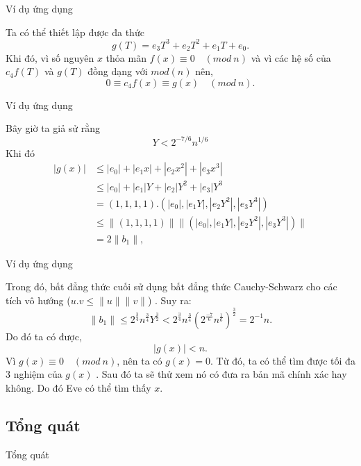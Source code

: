 \documentclass{beamer}
\begin{document}
\begin{frame}{Ví dụ ứng dụng}

Ta có thể thiết lập được đa thức $$g(T) = e_3T^3 + e_2T^2 + e_1T + e_0\text{.}$$
Khi đó, vì số nguyên $x$ thỏa mãn $f(x) \equiv 0 \quad (mod \ n) $ và vì các hệ số của $c_4f(T)$ và $g(T)$ đồng dạng với $mod(n)$ nên, $$0 \equiv c_4f(x) \equiv g(x) \quad (mod \ n)\text{.}$$

\end{frame}
\begin{frame}{Ví dụ ứng dụng}

Bây giờ ta giả sử rằng $$Y < 2^{-7/6}n^{1/6}$$
Khi đó $$
\begin{aligned}
|g(x)| & \leq |e_0|+|e_1x|+|e_2x^2|+|e_3x^3|\\
& \leq |e_0| + |e_1|Y + |e_2|Y^2 + |e_3|Y^3\\
& = (1, 1, 1, 1).(|e_0|, |e_1Y|, |e_2Y^2|, |e_3Y^3|)\\
&\leq \|(1, 1, 1, 1)\|\|(|e_0|, |e_1Y|, |e_2Y^2|, |e_3Y^3|)\| \\
& = 2\|b_1\|\text{,}
\end{aligned}
$$

\end{frame}
\begin{frame}{Ví dụ ứng dụng}

Trong đó, bất đẳng thức cuối sử dụng bất đẳng thức Cauchy-Schwarz cho các tích vô hướng  ($u.v \leq \|u\|\|v\|$) . Suy ra: $$\|b_1\| \leq 2^{\tfrac{3}{4}}n^{\tfrac{3}{4}}Y^{\tfrac{3}{2}} < 2^{\tfrac{3}{4}}n^{\tfrac{3}{4}}(2^{\tfrac{-7}{6}}n^{\tfrac{1}{6}})^{\tfrac{3}{2}} = 2^{-1}n \text{.}$$
Do đó ta có được, $$|g(x)| < n.$$
Vì $g(x) \equiv 0 \quad (mod \ n)$, nên ta có $g(x) = 0$. Từ đó, ta có thể tìm được tối đa 3 nghiệm của $g(x)$ . Sau đó ta sẽ thử xem nó có đưa ra bản mã chính xác hay không. Do đó Eve có thể tìm thấy $x$.\\

\end{frame}
\subsection{Tổng quát}
\begin{frame}{Tổng quát}


\end{frame}
\end{document}
